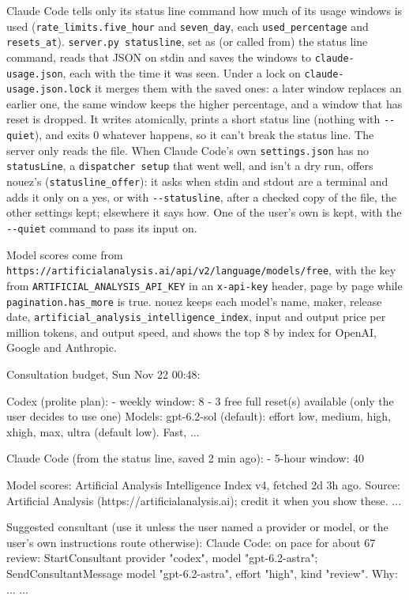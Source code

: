 \documentclass[10pt,a4paper]{article}
\newcommand{\code}[1]{\texttt{#1}}
\begin{document}
Claude Code tells only its status line command how much of its usage windows is used
(\code{rate\_limits.five\_hour} and \code{seven\_day}, each \code{used\_percentage} and
\code{resets\_at}). \code{server.py statusline}, set as (or called from) the status line command,
reads that JSON on stdin and saves the windows to \code{claude-usage.json}, each with the time it
was seen. Under a lock on \code{claude-usage.json.lock} it merges them with the saved ones: a later
window replaces an earlier one, the same window keeps the higher percentage, and a window that has
reset is dropped. It writes atomically, prints a short status line (nothing with \code{-{}-quiet}),
and exits 0 whatever happens, so it can't break the status line. The server only reads the file.
When Claude Code's own \code{settings.json} has no \code{statusLine}, a \code{dispatcher setup} that
went well, and isn't a dry run, offers nouez's (\code{statusline\_offer}): it asks when stdin and
stdout are a terminal and adds it only on a yes, or with \code{-{}-statusline}, after a checked copy
of the file, the other settings kept; elsewhere it says how. One of the user's own is kept, with the
\code{-{}-quiet} command to pass its input on.

Model scores come from \code{https://artificialanalysis.ai/api/v2/language/models/free}, with the key
from \code{ARTIFICIAL\_ANALYSIS\_API\_KEY} in an \code{x-api-key} header, page by page while
\code{pagination.has\_more} is true. nouez keeps each model's name, maker, release date,
\code{artificial\_analysis\_intelligence\_index}, input and output price per million tokens, and
output speed, and shows the top 8 by index for OpenAI, Google and Anthropic.

\begin{plain}
Consultation budget, Sun Nov 22 00:48:

Codex (prolite plan):
  - weekly window: 8%
  - 3 free full reset(s) available (only the user decides to use one)
  Models:
    gpt-6.2-sol (default): effort low, medium, high, xhigh, max, ultra (default low). Fast, ...

Claude Code (from the status line, saved 2 min ago):
  - 5-hour window: 40%

Model scores: Artificial Analysis Intelligence Index v4, fetched 2d 3h ago. Source: Artificial Analysis (https://artificialanalysis.ai); credit it when you show these.
  ...

Suggested consultant (use it unless the user named a provider or model, or the user's own instructions route otherwise):
  Claude Code: on pace for about 67%
  review: StartConsultant provider "codex", model "gpt-6.2-astra"; SendConsultantMessage model "gpt-6.2-astra", effort "high", kind "review". Why: ...
  ...
\end{plain}
\end{document}
